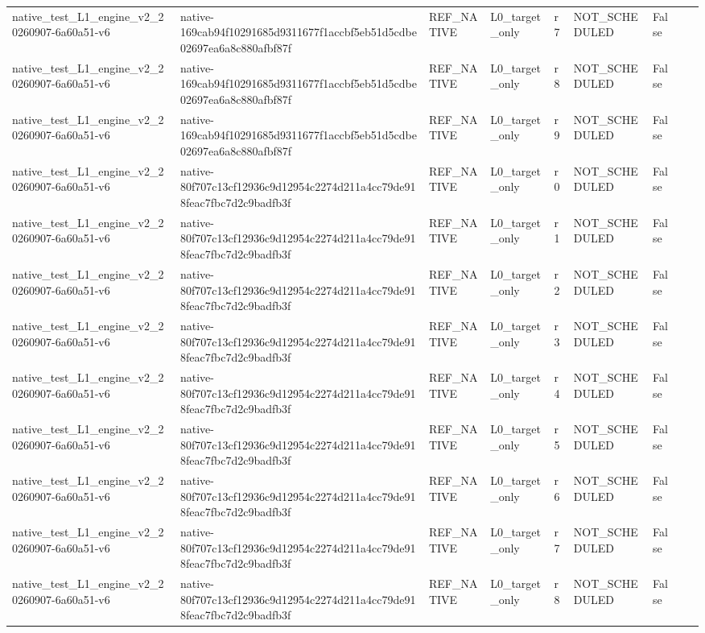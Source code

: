 \begin{tabular}{lllllllll}
native\_test\_L1\_engine\_v2\_20260907-6a60a51-v6 & native-169cab94f10291685d9311677f1accbf5eb51d5cdbe02697ea6a8c880afbf87f & REF\_NATIVE & L0\_target\_only & r7 & NOT\_SCHEDULED & False &  &  \\
native\_test\_L1\_engine\_v2\_20260907-6a60a51-v6 & native-169cab94f10291685d9311677f1accbf5eb51d5cdbe02697ea6a8c880afbf87f & REF\_NATIVE & L0\_target\_only & r8 & NOT\_SCHEDULED & False &  &  \\
native\_test\_L1\_engine\_v2\_20260907-6a60a51-v6 & native-169cab94f10291685d9311677f1accbf5eb51d5cdbe02697ea6a8c880afbf87f & REF\_NATIVE & L0\_target\_only & r9 & NOT\_SCHEDULED & False &  &  \\
native\_test\_L1\_engine\_v2\_20260907-6a60a51-v6 & native-80f707c13cf12936c9d12954c2274d211a4cc79de918feac7fbc7d2c9badfb3f & REF\_NATIVE & L0\_target\_only & r0 & NOT\_SCHEDULED & False &  &  \\
native\_test\_L1\_engine\_v2\_20260907-6a60a51-v6 & native-80f707c13cf12936c9d12954c2274d211a4cc79de918feac7fbc7d2c9badfb3f & REF\_NATIVE & L0\_target\_only & r1 & NOT\_SCHEDULED & False &  &  \\
native\_test\_L1\_engine\_v2\_20260907-6a60a51-v6 & native-80f707c13cf12936c9d12954c2274d211a4cc79de918feac7fbc7d2c9badfb3f & REF\_NATIVE & L0\_target\_only & r2 & NOT\_SCHEDULED & False &  &  \\
native\_test\_L1\_engine\_v2\_20260907-6a60a51-v6 & native-80f707c13cf12936c9d12954c2274d211a4cc79de918feac7fbc7d2c9badfb3f & REF\_NATIVE & L0\_target\_only & r3 & NOT\_SCHEDULED & False &  &  \\
native\_test\_L1\_engine\_v2\_20260907-6a60a51-v6 & native-80f707c13cf12936c9d12954c2274d211a4cc79de918feac7fbc7d2c9badfb3f & REF\_NATIVE & L0\_target\_only & r4 & NOT\_SCHEDULED & False &  &  \\
native\_test\_L1\_engine\_v2\_20260907-6a60a51-v6 & native-80f707c13cf12936c9d12954c2274d211a4cc79de918feac7fbc7d2c9badfb3f & REF\_NATIVE & L0\_target\_only & r5 & NOT\_SCHEDULED & False &  &  \\
native\_test\_L1\_engine\_v2\_20260907-6a60a51-v6 & native-80f707c13cf12936c9d12954c2274d211a4cc79de918feac7fbc7d2c9badfb3f & REF\_NATIVE & L0\_target\_only & r6 & NOT\_SCHEDULED & False &  &  \\
native\_test\_L1\_engine\_v2\_20260907-6a60a51-v6 & native-80f707c13cf12936c9d12954c2274d211a4cc79de918feac7fbc7d2c9badfb3f & REF\_NATIVE & L0\_target\_only & r7 & NOT\_SCHEDULED & False &  &  \\
native\_test\_L1\_engine\_v2\_20260907-6a60a51-v6 & native-80f707c13cf12936c9d12954c2274d211a4cc79de918feac7fbc7d2c9badfb3f & REF\_NATIVE & L0\_target\_only & r8 & NOT\_SCHEDULED & False &  &  \\

\end{tabular}
